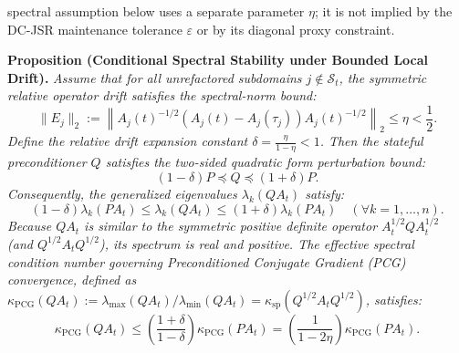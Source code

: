 \noindentThe spectral assumption below uses a separate parameter $\eta$; it is not implied by the DC-JSR maintenance tolerance $\varepsilon$ or by its diagonal proxy constraint.

\noindent\textbf{Proposition (Conditional Spectral Stability under Bounded Local Drift).}
\textit{Assume that for all unrefactored subdomains $j \notin \mathcal{S}_t$, the symmetric relative operator drift satisfies the spectral-norm bound:
\begin{equation}
\|E_j\|_2 := \left\| A_j(t)^{-1/2} \left( A_j(t) - A_j(\tau_j) \right) A_j(t)^{-1/2} \right\|_2 \le \eta < \frac{1}{2}.
\label{eq:prop_condition}
\end{equation}
Define the relative drift expansion constant $\delta = \frac{\eta}{1 - \eta} < 1$. Then the stateful preconditioner $Q$ satisfies the two-sided quadratic form perturbation bound:
\begin{equation}
(1 - \delta) P \preceq Q \preceq (1 + \delta) P.
\label{eq:quadratic_bound}
\end{equation}
Consequently, the generalized eigenvalues $\lambda_k(Q A_t)$ satisfy:
\begin{equation}
(1 - \delta) \lambda_k(P A_t) \le \lambda_k(Q A_t) \le (1 + \delta) \lambda_k(P A_t) \quad (\forall k=1, \dots, n).
\end{equation}
Because $Q A_t$ is similar to the symmetric positive definite operator $A_t^{1/2} Q A_t^{1/2}$ (and $Q^{1/2} A_t Q^{1/2}$), its spectrum is real and positive. The effective spectral condition number governing Preconditioned Conjugate Gradient (PCG) convergence, defined as $\kappa_{\text{PCG}}(Q A_t) := \lambda_{\max}(Q A_t) / \lambda_{\min}(Q A_t) = \kappa_{\text{sp}}(Q^{1/2} A_t Q^{1/2})$, satisfies:
\begin{equation}
\kappa_{\text{PCG}}(Q A_t) \le \left( \frac{1 + \delta}{1 - \delta} \right) \kappa_{\text{PCG}}(P A_t) = \left( \frac{1}{1 - 2\eta} \right) \kappa_{\text{PCG}}(P A_t).
\label{eq:condition_number_bound}
\end{equation}}

